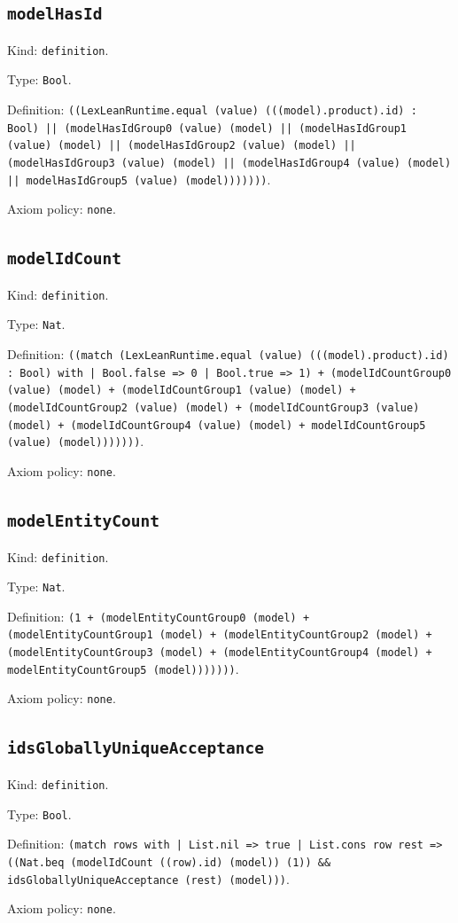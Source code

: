 \documentclass[11pt]{article}
\begin{document}
\subsection*{\texttt{modelHasId}}
\noindent Kind: \texttt{definition}.\par
\noindent Type: \texttt{Bool}.\par
\noindent Definition: \texttt{((LexLeanRuntime.equal (value) (((model).product).id) : Bool) || (modelHasIdGroup0 (value) (model) || (modelHasIdGroup1 (value) (model) || (modelHasIdGroup2 (value) (model) || (modelHasIdGroup3 (value) (model) || (modelHasIdGroup4 (value) (model) || modelHasIdGroup5 (value) (model)))))))}.\par
\noindent Axiom policy: \texttt{none}.\par
\subsection*{\texttt{modelIdCount}}
\noindent Kind: \texttt{definition}.\par
\noindent Type: \texttt{Nat}.\par
\noindent Definition: \texttt{((match (LexLeanRuntime.equal (value) (((model).product).id) : Bool) with | Bool.false => 0 | Bool.true => 1) + (modelIdCountGroup0 (value) (model) + (modelIdCountGroup1 (value) (model) + (modelIdCountGroup2 (value) (model) + (modelIdCountGroup3 (value) (model) + (modelIdCountGroup4 (value) (model) + modelIdCountGroup5 (value) (model)))))))}.\par
\noindent Axiom policy: \texttt{none}.\par
\subsection*{\texttt{modelEntityCount}}
\noindent Kind: \texttt{definition}.\par
\noindent Type: \texttt{Nat}.\par
\noindent Definition: \texttt{(1 + (modelEntityCountGroup0 (model) + (modelEntityCountGroup1 (model) + (modelEntityCountGroup2 (model) + (modelEntityCountGroup3 (model) + (modelEntityCountGroup4 (model) + modelEntityCountGroup5 (model)))))))}.\par
\noindent Axiom policy: \texttt{none}.\par
\subsection*{\texttt{idsGloballyUniqueAcceptance}}
\noindent Kind: \texttt{definition}.\par
\noindent Type: \texttt{Bool}.\par
\noindent Definition: \texttt{(match rows with | List.nil => true | List.cons row rest => ((Nat.beq (modelIdCount ((row).id) (model)) (1)) \&\& idsGloballyUniqueAcceptance (rest) (model)))}.\par
\noindent Axiom policy: \texttt{none}.\par
\end{document}
